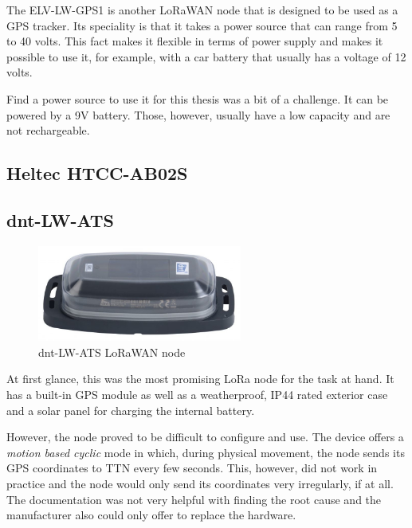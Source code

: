 The ELV-LW-GPS1 is another \ac{LoRaWAN} node that is designed to be used as a \ac{GPS} tracker.
Its speciality is that it takes a power source that can range from 5 to 40 volts.
This fact makes it flexible in terms of power supply and makes it possible to use it, for example, with a car battery that usually has a voltage of 12 volts.

Find a power source to use it for this thesis was a bit of a challenge.
It can be powered by a 9V battery.
Those, however, usually have a low capacity and are not rechargeable.



\subsection{Heltec HTCC-AB02S}


\subsection{dnt-LW-ATS}

\begin{figure}[h]
    \centering
    \includegraphics[width=0.6\textwidth]{pictures/hardware/gps-nodes/dnt-LW-ATS.jpg}
    \caption{dnt-LW-ATS \ac{LoRaWAN} node~\protect\cite{dnt_gmbh_dnt_nodate}}
\end{figure}

At first glance, this was the most promising \ac{LoRa} node for the task at hand.
It has a built-in \ac{GPS} module as well as a weatherproof, IP44 rated exterior case and a solar panel for charging the internal battery.

However, the node proved to be difficult to configure and use.
The device offers a \emph{motion based cyclic} mode in which, during physical movement, the node sends its \ac{GPS} coordinates to \ac{TTN} every few seconds.
This, however, did not work in practice and the node would only send its coordinates very irregularly, if at all.
The documentation was not very helpful with finding the root cause and the manufacturer also could only offer to replace the hardware.

